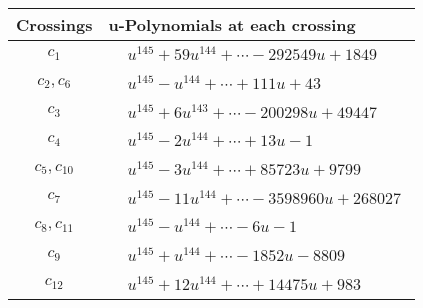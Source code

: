 \documentclass[1p]{elsarticle_modified}
\theoremstyle{definition}
\begin{document}
\begin{tabular}{m{50pt}|m{274pt}}
Crossings & \hspace{64pt}u-Polynomials at each crossing \\
\hline $$\begin{aligned}c_{1}\end{aligned}$$&$\begin{aligned}
&u^{145}+59 u^{144}+\cdots-292549 u+1849
\end{aligned}$\\
\hline $$\begin{aligned}c_{2},c_{6}\end{aligned}$$&$\begin{aligned}
&u^{145}- u^{144}+\cdots+111 u+43
\end{aligned}$\\
\hline $$\begin{aligned}c_{3}\end{aligned}$$&$\begin{aligned}
&u^{145}+6 u^{143}+\cdots-200298 u+49447
\end{aligned}$\\
\hline $$\begin{aligned}c_{4}\end{aligned}$$&$\begin{aligned}
&u^{145}-2 u^{144}+\cdots+13 u-1
\end{aligned}$\\
\hline $$\begin{aligned}c_{5},c_{10}\end{aligned}$$&$\begin{aligned}
&u^{145}-3 u^{144}+\cdots+85723 u+9799
\end{aligned}$\\
\hline $$\begin{aligned}c_{7}\end{aligned}$$&$\begin{aligned}
&u^{145}-11 u^{144}+\cdots-3598960 u+268027
\end{aligned}$\\
\hline $$\begin{aligned}c_{8},c_{11}\end{aligned}$$&$\begin{aligned}
&u^{145}- u^{144}+\cdots-6 u-1
\end{aligned}$\\
\hline $$\begin{aligned}c_{9}\end{aligned}$$&$\begin{aligned}
&u^{145}+u^{144}+\cdots-1852 u-8809
\end{aligned}$\\
\hline $$\begin{aligned}c_{12}\end{aligned}$$&$\begin{aligned}
&u^{145}+12 u^{144}+\cdots+14475 u+983
\end{aligned}$\\
\hline
\end{tabular}\\~\\
\end{document}
